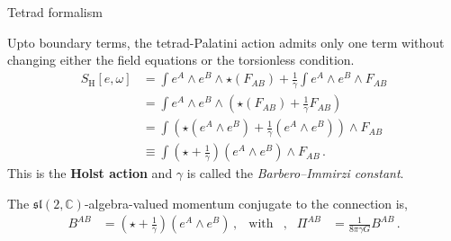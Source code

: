 \documentclass{beamer}
\newcommand\boldtext[1]{\textcolor{bolds}{\textbf{#1}}}
\newcommand\italictext[1]{\textcolor{italics}{\textit{#1}}}
\begin{document}
\begin{frame}{Tetrad formalism}
    \begin{list}{\maltese}{\leftmargin=1em \itemindent=0em}
        \item<1-> Upto boundary terms, the tetrad-Palatini action admits only one term without changing either the field equations or the torsionless condition.
        \begin{align}
            S_\text{H}[e,\omega]&=\int e^A\wedge e^B\wedge\star(F_{AB})+ \frac{1}{\gamma}\int e^A\wedge e^B\wedge F_{AB}\\
            &=\int e^A\wedge e^B\wedge\left(\star(F_{AB})+\frac{1}{\gamma} F_{AB}\right)\\
            &=\int\left(\star(e^A\wedge e^B)+\frac{1}{\gamma}(e^A\wedge e^B)\right)\wedge F_{AB}\\
            &\equiv\int\left(\star+\frac{1}{\gamma}\right)(e^A\wedge e^B)\wedge F_{AB}\,.
        \end{align}
        This is the \boldtext{Holst action} and $\gamma$ is called the \italictext{Barbero–Immirzi constant}.
        \item<2-> The $\mathfrak{sl}(2,\mathbb{C})$-algebra-valued momentum conjugate to the connection is,
        \begin{align}\label{b_mom_conj}
            B^{AB}&=\left(\star+\frac{1}{\gamma}\right)(e^A\wedge e^B)\,, &\text{with}&, &\Pi^{AB}&=\frac{1}{8\pi\gamma G}B^{AB}\,.
        \end{align}
    \end{list}
\end{frame}
\end{document}
